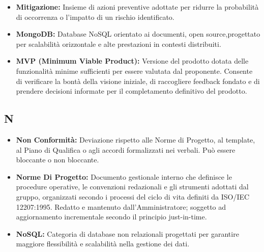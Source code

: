 \begin{itemize}[leftmargin=*]
          registrati nel foglio di calcolo condiviso e utilizzati per il
          monitoraggio dell'avanzamento.
      \item \textbf{Mitigazione:} Insieme di azioni preventive adottate per ridurre la probabilità di occorrenza o l'impatto di un rischio identificato.
      \item \textbf{MongoDB:} Database NoSQL orientato ai documenti, open source,progettato per scalabilità orizzontale e alte prestazioni in contesti distribuiti.
      \item \textbf{MVP (Minimum Viable Product):} Versione del prodotto dotata delle
          funzionalità minime sufficienti per essere valutata dal proponente.
          Consente di verificare la bontà della visione iniziale, di raccogliere
          feedback fondato e di prendere decisioni informate per il completamento
          definitivo del prodotto.
\end{itemize}
 
{}
\subsection*{N}
\begin{itemize}[leftmargin=*]
      \item \textbf{Non Conformità:} Deviazione rispetto alle Norme di Progetto, al template, al Piano di Qualifica o agli accordi formalizzati nei verbali. Può essere bloccante o non bloccante.
      \item \textbf{Norme Di Progetto:} Documento gestionale interno che definisce
          le procedure operative, le convenzioni redazionali e gli strumenti adottati
          dal gruppo, organizzati secondo i processi del ciclo di vita definiti da
          ISO/IEC 12207:1995. Redatto e mantenuto dall'Amministratore; soggetto
          ad aggiornamento incrementale secondo il principio just-in-time.
      \item \textbf{NoSQL:} Categoria di database non relazionali progettati per garantire maggiore flessibilità e scalabilità nella gestione dei dati.
\end{itemize}
 
{}
